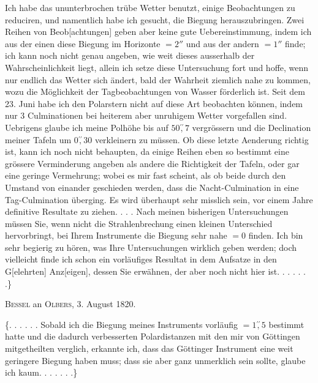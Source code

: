 Ich habe das ununterbrochen trübe Wetter benutzt, einige Beobachtungen zu reduciren, und namentlich habe ich gesucht, die Biegung herauszubringen. Zwei Reihen von Beob[achtungen] geben aber keine gute Uebereinstimmung, indem ich aus der einen diese Biegung im Horizonte \(=2''\) und aus der andern \(=1''\) finde; ich kann noch nicht genau angeben, wie weit dieses ausserhalb der Wahrscheinlichkeit liegt, allein ich setze diese Untersuchung fort und
\clearpage{}
\noindent hoffe, wenn nur endlich das Wetter sich ändert, bald der Wahrheit ziemlich nahe zu kommen, wozu die Möglichkeit der Tagbeobachtungen von Wasser förderlich ist. Seit dem 23. Juni habe ich den Polarstern nicht auf diese Art beobachten können, indem nur 3 Culminationen bei heiterem aber unruhigem Wetter vorgefallen sind. Uebrigens glaube ich meine Polhöhe bis auf \(50\overset{\prime\prime}{,}7\) vergrössern und die Declination meiner Tafeln um \(0\overset{\prime\prime}{,}30\) verkleinern zu müssen. Ob diese letzte Aenderung richtig ist, kann ich noch nicht behaupten, da einige Reihen eben so bestimmt eine grössere Verminderung angeben als andere die Richtigkeit der Tafeln, oder gar eine geringe Vermehrung; wobei es mir fast scheint, als ob beide durch den Umstand von einander geschieden werden, dass die Nacht-Culmination in eine Tag-Culmination überging. Es wird überhaupt sehr misslich sein, vor einem Jahre definitive Resultate zu ziehen. . . .
Nach meinen bisherigen Untersuchungen müssen Sie, wenn nicht die Strahlenbrechung einen kleinen Unterschied hervorbringt, bei Ihrem Instrumente die Biegung sehr nahe \(=0\) finden. Ich bin sehr begierig zu hören, was Ihre Untersuchungen wirklich geben werden; doch vielleicht finde ich schon ein vorläufiges Resultat in dem Aufsatze in den G[elehrten] Anz[eigen\begingroup\renewcommand{\thefootnote}{*)}\footnotemark\renewcommand{\thefootnote}{[*)}\footnotetext{Gottingische Gelehrte Anzeigen, Stück 91, 1820 Juni 5; Werke VI, S. 429.]}\endgroup], dessen Sie erwähnen, der aber noch nicht hier ist. . . . . . .\}

\begin{center}\textsc{Bessel} an \textsc{Olbers}, 3. August 1820.\end{center}
\noindent\hspace*{\parindent}\{. . . . . . Sobald ich die Biegung meines Instruments vorläufig \(=1\overset{\prime\prime}{,}5\) bestimmt hatte und die dadurch verbesserten Polardistanzen mit den mir von Göttingen mitgetheilten verglich, erkannte ich, dass das Göttinger Instrument eine weit geringere Biegung haben muss; dass sie aber ganz unmerklich sein sollte, glaube ich kaum. . . . . . .\}

